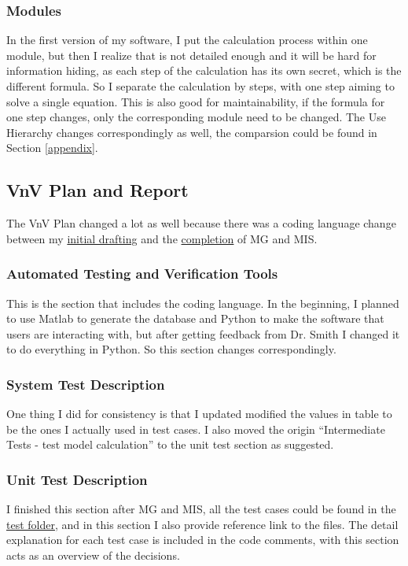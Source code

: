 \documentclass{article}
\begin{document}
\subsubsection{Modules}
In the first version of my software, I put the calculation process within one module, but then I realize that is not detailed enough and it will be hard for information hiding, as each step of the calculation has its own secret, which is the different formula. So I separate the calculation by steps, with one step aiming to solve a single equation. This is also good for maintainability, if the formula for one step changes, only the corresponding module need to be changed. The Use Hierarchy changes correspondingly as well, the comparsion could be found in Section \ref{appendix}.

\subsection{VnV Plan and Report}
The VnV Plan changed a lot as well because there was a coding language change between my \href{https://github.com/CynthiaLiu0805/BridgeCorrosion/blob/3a78fea11558b0c5a886bfcc70a0b7bec5653821/docs/VnVPlan/VnVPlan.pdf}{initial drafting} and the \href{https://github.com/CynthiaLiu0805/BridgeCorrosion/blob/main/docs/VnVPlan/VnVPlan.pdf}{completion} of MG and MIS.

\subsubsection{Automated Testing and Verification Tools}
This is the section that includes the coding language. In the beginning, I planned to use Matlab to generate the database and Python to make the software that users are interacting with, but after getting feedback from Dr. Smith I changed it to do everything in Python. So this section changes correspondingly. 

\subsubsection{System Test Description}
One thing I did for consistency is that I updated modified the values in table to be the ones I actually used in test cases. I also moved the origin ``Intermediate Tests - test model calculation'' to the unit test section as suggested.

\subsubsection{Unit Test Description}
I finished this section after MG and MIS, all the test cases could be found in the \href{https://github.com/CynthiaLiu0805/BridgeCorrosion/tree/main/tests}{test folder}, and in this section I also provide reference link to the files. The detail explanation for each test case is included in the code comments, with this section acts as an overview of the decisions.
\end{document}

